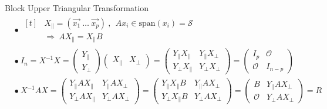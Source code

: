 \documentclass[12pt]{article}
\begin{document}
\vspace{15pt}
\hspace{10pt} Block Upper Triangular Transformation\\[10pt]
\(\begin{aligned}
	&\bullet\ \begin{aligned}[t]
			&X_\parallel = \left(\vec{x_1} \ \dots \ \vec{x_p}\right) 
				\ , \ \ Ax_i \in \text{span}(x_i) = \mathcal{S}\\[5pt]
			&\Rightarrow \ AX_\parallel = X_\parallel B
		\end{aligned}\\[5pt]
	&\bullet\ I_n = X^{-1} X = \left(\begin{matrix}
			Y_\parallel \\
			Y_\perp
		\end{matrix}\right) 
		\left(\begin{matrix}
			X_\parallel & X_\perp
		\end{matrix}\right)
		= 
		\left(\begin{matrix}
			Y_\parallel X_\parallel & Y_\parallel X_\perp\\
			Y_\perp X_\parallel & Y_\perp X_\perp
		\end{matrix}\right)
		= 
		\left(\begin{matrix}
			I_{p} & \mathcal{O}\\
			\mathcal{O} & I_{n-p}
		\end{matrix}\right)\\[10pt]
	&\bullet\ X^{-1}AX = \left(\begin{matrix}
			Y_\parallel A X_\parallel & Y_\parallel A X_\perp\\
			Y_\perp A X_\parallel & Y_\perp A X_\perp
		\end{matrix}\right)
		=
		\left(\begin{matrix}
			Y_\parallel X_\parallel B & Y_\parallel A X_\perp\\
			Y_\perp X_\parallel B & Y_\perp A X_\perp
		\end{matrix}\right)
		=
		\left(\begin{matrix}
			B & Y_\parallel A X_\perp\\
			\mathcal{O} & Y_\perp A X_\perp
		\end{matrix}\right)
		= R
\end{aligned}\)
\end{document}
